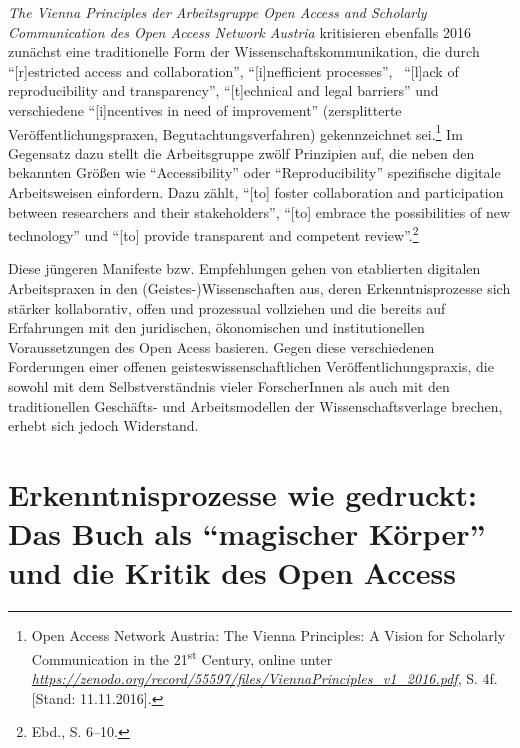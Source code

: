 \documentclass[a4paper,
fontsize=11pt,
oneside,
numbers=noperiodatend,
parskip=half-,
bibliography=totoc,
final
]{scrartcl}
\begin{document}
\emph{The Vienna Principles der Arbeitsgruppe Open Access and Scholarly
Communication des Open Access Network Austria} kritisieren ebenfalls
2016 zunächst eine traditionelle Form der Wissenschafts\-kom\-munikation,
die durch \enquote{{[}r{]}estricted access and collaboration},
\enquote{{[}i{]}nefficient processes}, \, \enquote{{[}l{]}ack of
reproducibility and transparency}, \enquote{{[}t{]}echnical and legal
barriers} und verschiedene \enquote{{[}i{]}n\-cent\-ives in need of
improvement} (zersplitterte Veröffentlichungspraxen,
Begutachtungsverfahren) gekennzeichnet sei.\footnote{Open Access Network
  Austria: The Vienna Principles: A Vision for Scholarly Communication
  in the 21\textsuperscript{st} Century, online unter
  \href{https://zenodo.org/record/55597/files/ViennaPrinciples_v1_2016.pdf}{\emph{https://zenodo.org/record/55597/files/ViennaPrinciples\_v1\_2016.pdf}},
  S. 4f. {[}Stand: 11.11.2016{]}.} Im Gegensatz dazu stellt die
Arbeitsgruppe zwölf Prinzipien auf, die neben den bekannten Größen wie
\enquote{Accessibility} oder \enquote{Reproducibility} spezifische
digitale Arbeitsweisen einfordern. Dazu zählt, \enquote{{[}to{]} foster
collaboration and participation between researchers and their
stakeholders}, \enquote{{[}to{]} embrace the possibilities of new
technology} und \enquote{{[}to{]} provide transparent and competent
review}.\footnote{Ebd., S. 6--10.}

Diese jüngeren Manifeste bzw. Empfehlungen gehen von etablierten
digitalen Arbeitspraxen in den (Geistes-)Wissenschaften aus, deren
Erkenntnisprozesse sich stärker kollaborativ, offen und prozessual
vollziehen und die bereits auf Erfahrungen mit den juridischen,
ökonomischen und institutionellen Voraussetzungen des Open Acess
basieren. Gegen diese verschiedenen Forderungen einer offenen
geisteswissenschaftlichen Veröffentlichungspraxis, die sowohl mit dem
Selbstverständnis vieler ForscherInnen als auch mit den traditionellen
Geschäfts- und Arbeitsmodellen der Wissenschaftsverlage brechen, erhebt
sich jedoch Widerstand.

\section*{\texorpdfstring{Erkenntnisprozesse wie gedruckt: Das Buch
als \enquote{magischer Körper} und die Kritik des Open
Access}{Erkenntnisprozesse wie gedruckt: Das Buch als magischer Körper und die Kritik des Open Access}}\label{erkenntnisprozesse-wie-gedruckt-das-buch-als-magischer-kuxf6rper-und-die-kritik-des-open-access}
\end{document}
